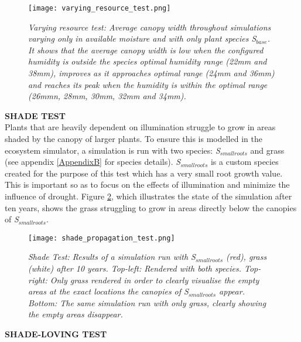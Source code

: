 \begin{figure}
\center
	\texttt{[image: varying\_resource\_test.png]}
	\caption{ \textit{Varying resource test: Average canopy width throughout simulations varying only in available moisture and with only plant species \textit{S$_{base}$}. It shows that the average canopy width is low when the configured humidity is outside the species optimal humidity range (22mm and 38mm), improves as it approaches optimal range (24mm and 36mm) and reaches its peak when the humidity is within the optimal range (26mmn, 28mm, 30mm, 32mm and 34mm).}}
	\label{fig:varying_resource_test}
\end{figure}

\textbf{SHADE TEST}\\

Plants that are heavily dependent on illumination struggle to grow in areas shaded by the canopy of larger plants. To ensure this is modelled in the ecosystem simulator, a simulation is run with two species: \textit{S$_{smallroots}$} and grass (see appendix \ref{AppendixB} for species details). \textit{S$_{smallroots}$} is a custom species created for the purpose of this test which has a very small root growth value. This is important so as to focus on the effects of illumination and minimize the influence of drought. Figure \ref{fig:shade_test}, which illustrates the state of the simulation after ten years, shows the grass struggling to grow in areas directly below the canopies of \textit{S$_{smallroots}$}.\\

\begin{figure}
\center
	\texttt{[image: shade\_propagation\_test.png]}
	\caption{ \textit{Shade Test: Results of a simulation run with \textit{S$_{smallroots}$} (red), grass (white) after 10 years. Top-left: Rendered with both species. Top-right: Only grass rendered in order to clearly visualise the empty areas at the exact locations the canopies of \textit{S$_{smallroots}$} appear. Bottom: The same simulation run with only grass, clearly showing the empty areas disappear.}} 
	\label{fig:shade_test}
\end{figure}

\textbf{SHADE-LOVING TEST}\\

